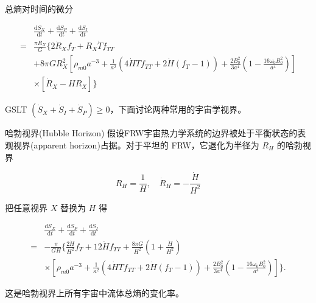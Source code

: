 \documentclass[9pt, dvipsnames]{beamer} %
\begin{document}
\begin{frame}
    总熵对时间的微分

    $$
    \begin{aligned}
        &\frac{\mathrm{d}S_X }{\mathrm{d}t } + \frac{\mathrm{d}S_P }{\mathrm{d}t } + \frac{\mathrm{d}S_I }{\mathrm{d}t } \\
        =&\frac{\pi R_X }{G } \bigg\{2\dot{R}_X f_T + R_X\dot{T}f_{TT} \\
        &+ 8\pi G R_X^2 \left[\rho_{m0}a^{-3} + \frac{1 }{\kappa^2 } \left(4\dot{H} T f_{TT} + 2\dot{H}\left(f_T-1 \right) \right) + \frac{2B_0^2 }{3a^4 } \left(1-\frac{16\omega_0 B_0^2 }{a^4 }  \right) \right] \\
        &\times \left[\dot{R}_X - H R_X \right] \bigg\}
    \end{aligned}
    $$

    GSLT $(\dot{S}_X+\dot{S}_I+\dot{S}_P)\geqslant 0$，下面讨论两种常用的宇宙学视界。

\end{frame}

\begin{frame}{哈勃视界(Hubble Horizon)}
    假设FRW宇宙热力学系统的边界被处于平衡状态的表观视界(apparent horizon)占据。对于平坦的 FRW，它退化为半径为 $R_H$ 的哈勃视界

    $$
    R_H = \frac{1 }{H } ,\quad
    \dot{R}_H = -\frac{\dot{H} }{H^2 }
    $$

    把任意视界 $X$ 替换为 $H$ 得

    $$
    \begin{aligned}
        &\frac{\mathrm{d}S_X }{\mathrm{d}t } + \frac{\mathrm{d}S_P }{\mathrm{d}t } + \frac{\mathrm{d}S_I }{\mathrm{d}t } \\
        =&-\frac{\pi }{G H} \bigg\{\frac{2\dot{H} }{H^2 } f_T + 12\dot{H}f_{TT} +\frac{8\pi G }{H^2 }\left(1+\frac{\dot{H} }{H^2 }  \right) \\
        &\times \left[\rho_{m0}a^{-3} + \frac{1 }{\kappa^2 } \left(4\dot{H}T f_{TT} + 2\dot{H}\left(f_T-1 \right) \right) + \frac{2 B_0^2 }{3a^4 } \left(1-\frac{16\omega_0 B_0^2 }{a^4 }  \right) \right] \bigg\}.
        \end{aligned}
    $$

    这是哈勃视界上所有宇宙中流体总熵的变化率。
    
\end{frame}
\end{document}
